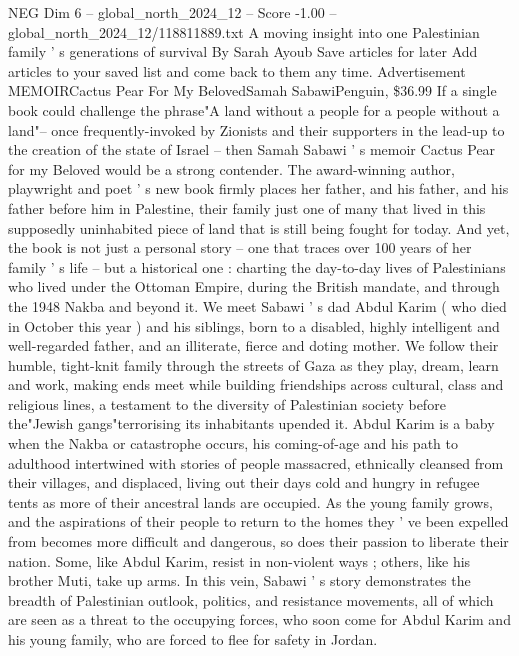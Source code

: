 \begin{textsample}{NEG Dim 6 – global\_north\_2024\_12 – Score -1.00 – global\_north\_2024\_12/118811889.txt}  \label{ex:f6_neg_195}
A moving insight into one Palestinian family ' s generations of survival By Sarah Ayoub Save articles for later Add articles to your saved list and come back to them any time.
Advertisement MEMOIRCactus Pear For My BelovedSamah SabawiPenguin, \$36.99 If a single book could challenge the phrase"A land without a people for a people without a land"-- once frequently-invoked by Zionists and their supporters in the lead-up to the creation of the state of Israel -- then Samah Sabawi ' s memoir Cactus Pear for my Beloved would be a strong contender.
The award-winning author, playwright and poet ' s new book firmly places her father, and his father, and his father before him in Palestine, their family just one of many that lived in this supposedly uninhabited piece of land that is still being fought for today.
And yet, the book is not just a personal story -- one that traces over 100 years of her family ' s life -- but a historical one : charting the day-to-day lives of Palestinians who lived under the Ottoman Empire, during the British mandate, and through the 1948 Nakba and beyond it.
We meet Sabawi ' s dad Abdul Karim ( who died in October this year ) and his siblings, born to a disabled, highly intelligent and well-regarded father, and an illiterate, fierce and doting mother.
We follow their humble, tight-knit family through the streets of Gaza as they play, dream, learn and work, making ends meet while building friendships across cultural, class and religious lines, a testament to the diversity of Palestinian society before the"Jewish gangs"terrorising its inhabitants upended it.
Abdul Karim is a baby when the Nakba or catastrophe occurs, his coming-of-age and his path to adulthood intertwined with stories of people massacred, ethnically cleansed from their villages, and displaced, living out their days cold and hungry in refugee tents as more of their ancestral lands are occupied.
As the young family grows, and the aspirations of their people to return to the homes they ' ve been expelled from becomes more difficult and dangerous, so does their passion to liberate their nation.
Some, like Abdul Karim, resist in non-violent ways ; others, like his brother Muti, take up arms.
In this vein, Sabawi ' s story demonstrates the breadth of Palestinian outlook, politics, and resistance movements, all of which are seen as a threat to the occupying forces, who soon come for Abdul Karim and his young family, who are forced to flee for safety in Jordan.

\end{textsample}
